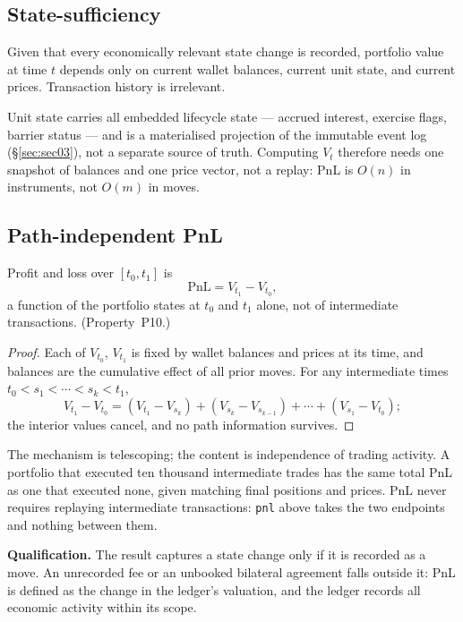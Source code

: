 \subsection{State-sufficiency}

\begin{principle}
\label{prin:state-sufficiency}
Given that every economically relevant state change is recorded, portfolio value at time $t$ depends only on current wallet balances, current unit state, and current prices. Transaction history is irrelevant.
\end{principle}

\noindent Unit state carries all embedded lifecycle state --- accrued interest, exercise flags, barrier status --- and is a materialised projection of the immutable event log (\S\ref{sec:sec03}), not a separate source of truth. Computing $V_t$ therefore needs one snapshot of balances and one price vector, not a replay: PnL is $O(n)$ in instruments, not $O(m)$ in moves.

\subsection{Path-independent PnL}

\begin{theorem}
\label{inv:P10}
Profit and loss over $[t_0, t_1]$ is
\[
\mathrm{PnL} = V_{t_1} - V_{t_0},
\]
a function of the portfolio states at $t_0$ and $t_1$ alone, not of intermediate transactions. (Property~P10.)
\end{theorem}

\begin{proof}
Each of $V_{t_0}$, $V_{t_1}$ is fixed by wallet balances and prices at its time, and balances are the cumulative effect of all prior moves. For any intermediate times $t_0 < s_1 < \cdots < s_k < t_1$,
\[
V_{t_1} - V_{t_0} = (V_{t_1} - V_{s_k}) + (V_{s_k} - V_{s_{k-1}}) + \cdots + (V_{s_1} - V_{t_0});
\]
the interior values cancel, and no path information survives.
\end{proof}

\noindent The mechanism is telescoping; the content is independence of trading activity. A portfolio that executed ten thousand intermediate trades has the same total PnL as one that executed none, given matching final positions and prices. PnL never requires replaying intermediate transactions: \texttt{pnl} above takes the two endpoints and nothing between them.

\medskip
\noindent\textbf{Qualification.} The result captures a state change only if it is recorded as a move. An unrecorded fee or an unbooked bilateral agreement falls outside it: PnL is defined as the change in the ledger's valuation, and the ledger records all economic activity within its scope.


